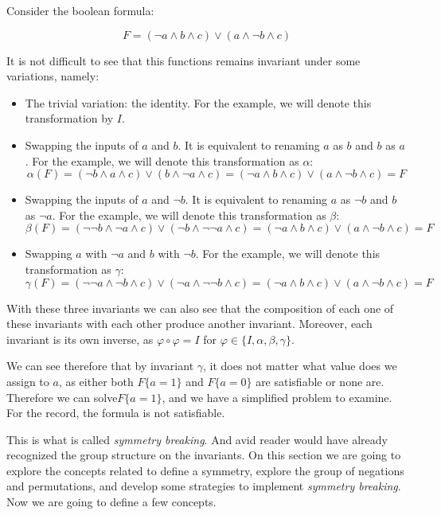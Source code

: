 \begin{example}
Consider the boolean formula:

$$ F = (\neg a \land b  \land c) \lor (a \land \neg b \land c)$$

It is not difficult to see that this functions remains invariant under some variations, namely:

\begin{itemize}
\item The trivial variation: the identity. For the example, we will denote this transformation by  $I$.

\item Swapping the inputs of $a$ and $b$. It is equivalent to renaming $a$ as $b$ and $b$ as $a$. For the example, we will denote this transformation as $\alpha$: 
  $$\alpha(F) = (\neg b \land a  \land c) \lor (b \land \neg a \land c) = (\neg a \land b  \land c) \lor (a \land \neg b \land c) = F$$
\item Swapping the inputs of $a$ and $\neg b$. It is equivalent to renaming $a$ as $\neg b$ and $b$ as $\neg a$. For the example, we will denote this transformation as $\beta$: 
  $$\beta(F) = (\neg \neg b \land \neg a  \land c) \lor (\neg b \land \neg \neg a \land c) = (\neg a \land b  \land c) \lor (a \land \neg b \land c) = F$$

\item Swapping $a$ with $\neg a$ and $b$ with $\neg b$. For the example, we will denote this transformation as $\gamma$: 
  $$\gamma(F) = (\neg \neg a \land \neg b  \land c) \lor (\neg a \land \neg \neg b \land c) = (\neg a \land b  \land c) \lor (a \land \neg b \land c) = F$$
\end{itemize}

With these three invariants we can also see that the composition of each one of these invariants with each other produce another invariant. Moreover, each invariant is its own inverse, as $\varphi \circ \varphi = I $ for $\varphi \in \{I, \alpha, \beta, \gamma\}$.

We can see therefore that by invariant $\gamma$, it does not matter what value does we assign to $a$, as either both $F\{a = 1\}$ and $F\{a=0\}$ are satisfiable or none are. Therefore we can solve$F\{a=1\}$, and we have a simplified problem to examine. For the record, the formula is not satisfiable.

\end{example}



This is what is called \emph{symmetry breaking}. And avid reader would have already recognized the group structure on the invariants.  On this section we are going to explore the concepts related to define a symmetry, explore the group of negations and permutations, and develop some strategies to implement \emph{symmetry breaking}.  Now we are going to define a few concepts.


